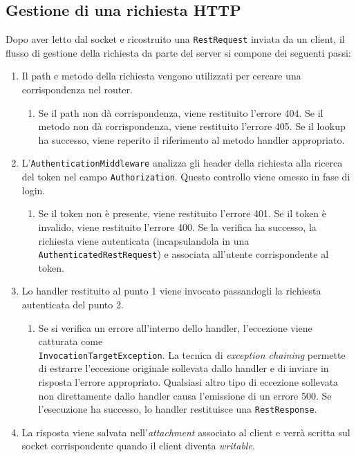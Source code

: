 \documentclass[a4paper,8pt]{article} %
\def\code#1{\texttt{#1}}
\begin{document}
\subsection{Gestione di una richiesta HTTP}
\label{sec:http_flow}

Dopo aver letto dal socket e ricostruito una \code{RestRequest} inviata da un client, il flusso di gestione della richiesta da parte del server si compone dei seguenti passi:
\begin{enumerate}
    \item Il path e metodo della richiesta vengono utilizzati per cercare una corrispondenza nel router.
          \begin{enumerate}
              \item Se il path non dà corrispondenza, viene restituito l'errore 404. Se il metodo non dà corrispondenza, viene restituito l'errore 405. Se il lookup ha successo, viene reperito il riferimento al metodo handler appropriato.
          \end{enumerate}
    \item L'\code{AuthenticationMiddleware} analizza gli header della richiesta alla ricerca del token nel campo \code{Authorization}. Questo controllo viene omesso in fase di login.
          \begin{enumerate}
              \item Se il token non è presente, viene restituito l'errore 401. Se il token è invalido, viene restituito l'errore 400. Se la verifica ha successo, la richiesta viene autenticata (incapsulandola in una \code{AuthenticatedRestRequest}) e associata all'utente corrispondente al token.
          \end{enumerate}
    \item Lo handler restituito al punto 1 viene invocato passandogli la richiesta autenticata del punto 2.
          \begin{enumerate}
              \item Se si verifica un errore all'interno dello handler, l'eccezione viene catturata come\\ \code{InvocationTargetException}. La tecnica di \emph{exception chaining} permette di estrarre l'eccezione originale
                    sollevata dallo handler e di inviare in risposta l'errore appropriato. Qualsiasi altro tipo di eccezione sollevata non direttamente dallo handler causa l'emissione di un errore 500. Se l'esecuzione ha successo, lo handler restituisce una \code{RestResponse}.
          \end{enumerate}
    \item La risposta viene salvata nell'\emph{attachment} associato al client e verrà scritta sul socket corrispondente quando il client diventa \emph{writable}.
\end{enumerate}
\end{document}
